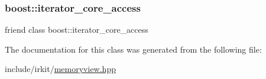\subsubsection{\texorpdfstring{boost\+::iterator\+\_\+core\+\_\+access}{boost::iterator\_core\_access}}
{\footnotesize\ttfamily friend class boost\+::iterator\+\_\+core\+\_\+access\hspace{0.3cm}{\ttfamily [friend]}}



The documentation for this class was generated from the following file\+:\begin{DoxyCompactItemize}
\item 
include/irkit/\mbox{\hyperlink{memoryview_8hpp}{memoryview.\+hpp}}\end{DoxyCompactItemize}
